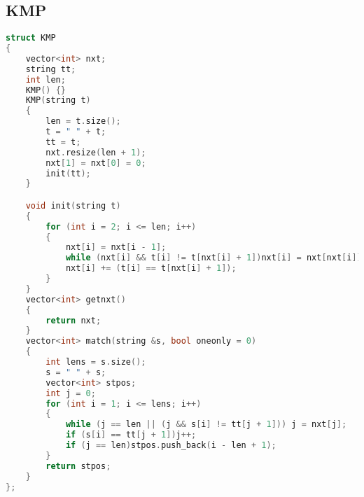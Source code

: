 \subsection{KMP}
\begin{lstlisting}[language=C++]
struct KMP
{
    vector<int> nxt;
    string tt;
    int len;
    KMP() {}
    KMP(string t)
    {
        len = t.size();
        t = " " + t;
        tt = t;
        nxt.resize(len + 1);
        nxt[1] = nxt[0] = 0;
        init(tt);
    }

    void init(string t)
    {
        for (int i = 2; i <= len; i++)
        {
            nxt[i] = nxt[i - 1];
            while (nxt[i] && t[i] != t[nxt[i] + 1])nxt[i] = nxt[nxt[i]];
            nxt[i] += (t[i] == t[nxt[i] + 1]);
        }
    }
    vector<int> getnxt()
    {
        return nxt;
    }
    vector<int> match(string &s, bool oneonly = 0)
    {
        int lens = s.size();
        s = " " + s;
        vector<int> stpos;
        int j = 0;
        for (int i = 1; i <= lens; i++)
        {
            while (j == len || (j && s[i] != tt[j + 1])) j = nxt[j];
            if (s[i] == tt[j + 1])j++;
            if (j == len)stpos.push_back(i - len + 1);
        }
        return stpos;
    }
};
\end{lstlisting}
